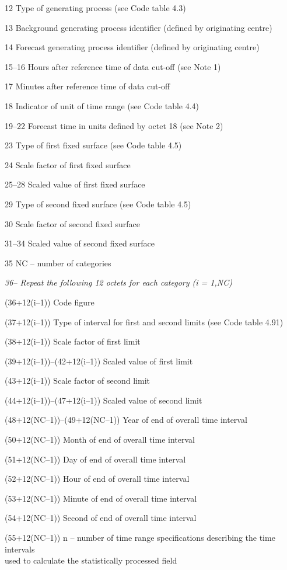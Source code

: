 12 Type of generating process (see Code table 4.3)

13 Background generating process identifier (defined by originating centre)

14 Forecast generating process identifier (defined by originating centre)

15--16 Hours after reference time of data cut-off (see Note 1)

17 Minutes after reference time of data cut-off

18 Indicator of unit of time range (see Code table 4.4)

19--22 Forecast time in units defined by octet 18 (see Note 2)

23 Type of first fixed surface (see Code table 4.5)

24 Scale factor of first fixed surface

25--28 Scaled value of first fixed surface

29 Type of second fixed surface (see Code table 4.5)

30 Scale factor of second fixed surface

31--34 Scaled value of second fixed surface

35 NC -- number of categories

\emph{36-- Repeat the following 12 octets for each category (i = 1,NC)}

(36+12(i--1)) Code figure

(37+12(i--1)) Type of interval for first and second limits (see Code table 4.91)

(38+12(i--1)) Scale factor of first limit

(39+12(i--1))--(42+12(i--1)) Scaled value of first limit

(43+12(i--1)) Scale factor of second limit

(44+12(i--1))--(47+12(i--1)) Scaled value of second limit

(48+12(NC--1))--(49+12(NC--1)) Year of end of overall time interval

(50+12(NC--1)) Month of end of overall time interval

(51+12(NC--1)) Day of end of overall time interval

(52+12(NC--1)) Hour of end of overall time interval

(53+12(NC--1)) Minute of end of overall time interval

(54+12(NC--1)) Second of end of overall time interval

(55+12(NC--1)) n -- number of time range specifications describing the time intervals\\
used to calculate the statistically processed field

